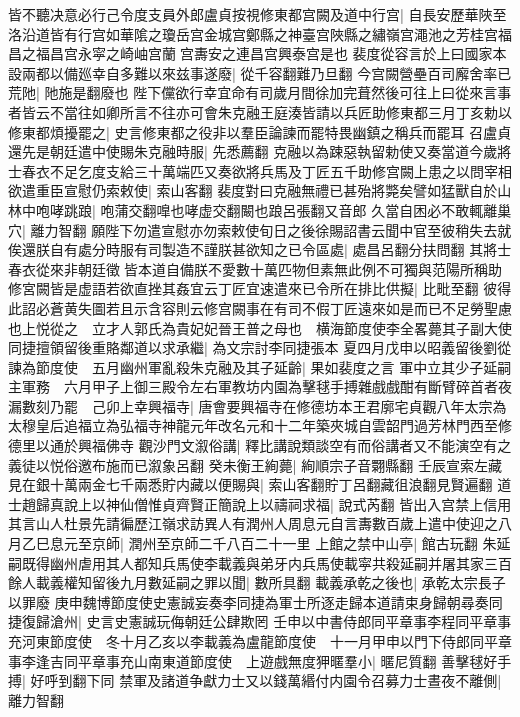 皆不聽决意必行己令度支員外郎盧貞按視修東都宫闕及道中行宫|{
	自長安歷華陜至洛沿道皆有行宫如華隂之瓊岳宫金城宫鄭縣之神臺宫陜縣之繡嶺宫澠池之芳桂宫福昌之福昌宫永寜之崎岫宫蘭宫夀安之連昌宫興泰宫是也}
裴度從容言於上曰國家本設兩都以備廵幸自多難以來兹事遂廢|{
	從千容翻難乃旦翻}
今宫闕營壘百司廨舍率已荒阤|{
	阤施是翻廢也}
陛下儻欲行幸宜命有司歲月間徐加完葺然後可往上曰從來言事者皆云不當往如卿所言不往亦可會朱克融王庭湊皆請以兵匠助修東都三月丁亥勅以修東都煩擾罷之|{
	史言修東都之役非以羣臣論諫而罷特畏幽鎮之稱兵而罷耳}
召盧貞還先是朝廷遣中使賜朱克融時服|{
	先悉薦翻}
克融以為踈惡執留勅使又奏當道今歲將士春衣不足乞度支給三十萬端匹又奏欲將兵馬及丁匠五千助修宫闕上患之以問宰相欲遣重臣宣慰仍索敕使|{
	索山客翻}
裴度對曰克融無禮已甚殆將斃矣譬如猛獸自於山林中咆哮跳踉|{
	咆蒲交翻嘷也哮虚交翻闞也踉呂張翻又音郎}
久當自困必不敢輒離巢穴|{
	離力智翻}
願陛下勿遣宣慰亦勿索敕使旬日之後徐賜詔書云聞中官至彼稍失去就俟還朕自有處分時服有司製造不謹朕甚欲知之已令區處|{
	處昌呂翻分扶問翻}
其將士春衣從來非朝廷徵皆本道自備朕不愛數十萬匹物但素無此例不可獨與范陽所稱助修宮闕皆是虚語若欲直挫其姦宜云丁匠宜速遣來已令所在排比供擬|{
	比毗至翻}
彼得此詔必蒼黄失圖若且示含容則云修宫闕事在有司不假丁匠遠來如是而已不足勞聖慮也上悦從之　立才人郭氏為貴妃妃晉王普之母也　横海節度使李全畧薨其子副大使同捷擅領留後重賂鄰道以求承繼|{
	為文宗討李同捷張本}
夏四月戊申以昭義留後劉從諫為節度使　五月幽州軍亂殺朱克融及其子延齡|{
	果如裴度之言}
軍中立其少子延嗣主軍務　六月甲子上御三殿令左右軍教坊内園為擊毬手搏雜戲戲酣有斷臂碎首者夜漏數刻乃罷　己卯上幸興福寺|{
	唐會要興福寺在修德坊本王君廓宅貞觀八年太宗為太穆皇后追福立為弘福寺神龍元年改名元和十二年築夾城自雲韶門過芳林門西至修德里以通於興福佛寺}
觀沙門文溆俗講|{
	釋比講說類談空有而俗講者又不能演空有之義徒以悦俗邀布施而已溆象呂翻}
癸未衡王絢薨|{
	絢順宗子音翾縣翻}
壬辰宣索左藏見在銀十萬兩金七千兩悉貯内藏以便賜與|{
	索山客翻貯丁呂翻藏徂浪翻見賢遍翻}
道士趙歸真說上以神仙僧惟貞齊賢正簡說上以禱祠求福|{
	說式芮翻}
皆出入宫禁上信用其言山人杜景先請徧歷江嶺求訪異人有潤州人周息元自言夀數百歲上遣中使迎之八月乙巳息元至京師|{
	潤州至京師二千八百二十一里}
上館之禁中山亭|{
	館古玩翻}
朱延嗣既得幽州虐用其人都知兵馬使李載義與弟牙内兵馬使載寜共殺延嗣并屠其家三百餘人載義權知留後九月數延嗣之罪以聞|{
	數所具翻}
載義承乾之後也|{
	承乾太宗長子以罪廢}
庚申魏博節度使史憲誠妄奏李同捷為軍士所逐走歸本道請束身歸朝尋奏同捷復歸滄州|{
	史言史憲誠玩侮朝廷公肆欺罔}
壬申以中書侍郎同平章事李程同平章事充河東節度使　冬十月乙亥以李載義為盧龍節度使　十一月甲申以門下侍郎同平章事李逢吉同平章事充山南東道節度使　上遊戲無度狎暱羣小|{
	暱尼質翻}
善擊毬好手搏|{
	好呼到翻下同}
禁軍及諸道争獻力士又以錢萬緡付内園令召募力士晝夜不離側|{
	離力智翻}
